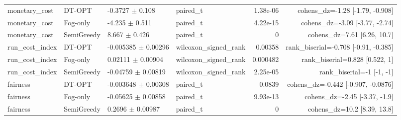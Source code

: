 \begin{table}[t]
\begin{tabular}{llllrr}
monetary\_cost & DT-OPT & -0.3727 $\pm$ 0.108 & paired\_t & 1.38e-06 & cohens\_dz=-1.28 [-1.79, -0.908] \\
monetary\_cost & Fog-only & -4.235 $\pm$ 0.511 & paired\_t & 4.22e-15 & cohens\_dz=-3.09 [-3.77, -2.74] \\
monetary\_cost & SemiGreedy & 8.667 $\pm$ 0.426 & paired\_t & 0 & cohens\_dz=7.61 [6.26, 10.7] \\
run\_cost\_index & DT-OPT & -0.005385 $\pm$ 0.00296 & wilcoxon\_signed\_rank & 0.00358 & rank\_biserial=-0.708 [-0.91, -0.385] \\
run\_cost\_index & Fog-only & 0.02111 $\pm$ 0.00904 & wilcoxon\_signed\_rank & 0.000482 & rank\_biserial=0.828 [0.522, 1] \\
run\_cost\_index & SemiGreedy & -0.04759 $\pm$ 0.00819 & wilcoxon\_signed\_rank & 2.25e-05 & rank\_biserial=-1 [-1, -1] \\
fairness & DT-OPT & -0.003648 $\pm$ 0.00308 & paired\_t & 0.0839 & cohens\_dz=-0.442 [-0.907, -0.0876] \\
fairness & Fog-only & -0.05625 $\pm$ 0.00858 & paired\_t & 9.93e-13 & cohens\_dz=-2.45 [-3.37, -1.9] \\
fairness & SemiGreedy & 0.2696 $\pm$ 0.00987 & paired\_t & 0 & cohens\_dz=10.2 [8.39, 13.8] \\
\bottomrule
\end{tabular}
\end{table}

